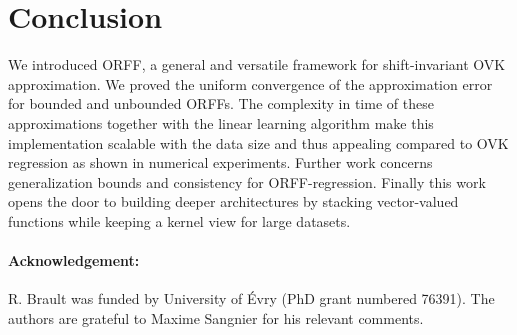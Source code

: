 \documentclass[twocolumn]{article}
\begin{document}
\section{Conclusion}
\label{sec:conclusion}
%
We introduced ORFF, a general and versatile framework for shift-invariant OVK
approximation. We proved the uniform convergence of the approximation error for
bounded and unbounded ORFFs. The complexity in time of these approximations
together with the linear learning algorithm make this implementation scalable
with the data size and thus appealing compared to OVK regression as shown in
numerical experiments. Further work concerns generalization bounds and
consistency for ORFF-regression. Finally this work opens the door to building
deeper architectures by stacking vector-valued functions while keeping a kernel
view for large datasets.

\paragraph{Acknowledgement:}
R. Brault was funded by  University of \'Evry (PhD grant numbered 76391). The
authors are grateful to Maxime Sangnier for his relevant comments.

\scriptsize

\end{document}
